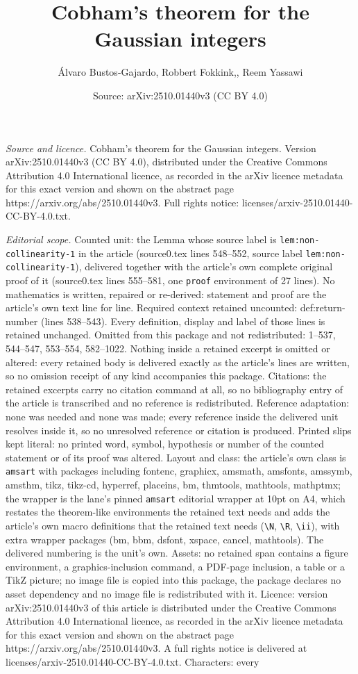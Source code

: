 \documentclass[10pt,a4paper]{amsart}
\title[Cobham's theorem for the Gaussian integers]{Cobham's theorem for the Gaussian integers}
\author{\'Alvaro Bustos-Gajardo, Robbert Fokkink,, Reem Yassawi}
\date{Source: arXiv:2510.01440v3 (CC BY 4.0)}
\begin{document}
\maketitle

\noindent\emph{Source and licence.} Cobham's theorem for the Gaussian integers. Version arXiv:2510.01440v3 (CC BY 4.0), distributed under the Creative Commons Attribution 4.0 International licence, as recorded in the arXiv licence metadata for this exact version and shown on the abstract page https://arxiv.org/abs/2510.01440v3. Full rights notice: licenses/arxiv-2510.01440-CC-BY-4.0.txt.\par\smallskip

\noindent\textit{Editorial scope.} Counted unit: the Lemma whose source label is \texttt{lem:non-collinearity-1} in the article (source0.tex lines 548--552, source label \texttt{lem:non-collinearity-1}), delivered together with the article's own complete original proof of it (source0.tex lines 555--581, one \texttt{proof} environment of 27 lines). No mathematics is written, repaired or re-derived: statement and proof are the article's own text line for line. Required context retained uncounted: def:return-number (lines 538--543). Every definition, display and label of those lines is retained unchanged. Omitted from this package and not redistributed: 1--537, 544--547, 553--554, 582--1022. Nothing inside a retained excerpt is omitted or altered: every retained body is delivered exactly as the article's lines are written, so no omission receipt of any kind accompanies this package. Citations: the retained excerpts carry no citation command at all, so no bibliography entry of the article is transcribed and no reference is redistributed. Reference adaptation: none was needed and none was made; every reference inside the delivered unit resolves inside it, so no unresolved reference or citation is produced. Printed slips kept literal: no printed word, symbol, hypothesis or number of the counted statement or of its proof was altered. Layout and class: the article's own class is \texttt{amsart} with packages including fontenc, graphicx, amsmath, amsfonts, amssymb, amsthm, tikz, tikz-cd, hyperref, placeins, bm, thmtools, mathtools, mathptmx; the wrapper is the lane's pinned \texttt{amsart} editorial wrapper at 10pt on A4, which restates the theorem-like environments the retained text needs and adds the article's own macro definitions that the retained text needs (\texttt{\textbackslash N}, \texttt{\textbackslash R}, \texttt{\textbackslash ii}), with extra wrapper packages (bm, bbm, dsfont, xspace, cancel, mathtools). The delivered numbering is the unit's own. Assets: no retained span contains a figure environment, a graphics-inclusion command, a PDF-page inclusion, a table or a TikZ picture; no image file is copied into this package, the package declares no asset dependency and no image file is redistributed with it. Licence: version arXiv:2510.01440v3 of this article is distributed under the Creative Commons Attribution 4.0 International licence, as recorded in the arXiv licence metadata for this exact version and shown on the abstract page https://arxiv.org/abs/2510.01440v3. A full rights notice is delivered at licenses/arxiv-2510.01440-CC-BY-4.0.txt. Characters: every 
\end{document}
